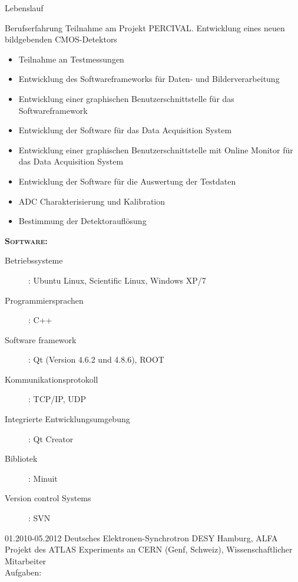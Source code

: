\documentclass[11pt,a4paper]{scrartcl}
\begin{document}
\begin{cv}{Lebenslauf}
\begin{cvlist}{Berufserfahrung}
Teilnahme am Projekt PERCIVAL. Entwicklung eines neuen
bildgebenden CMOS-Detektors
\begin{itemize}
  \item Teilnahme an Testmessungen
  \item Entwicklung des Softwareframeworks f{\"u}r Daten- und
  Bilderverarbeitung
  \item Entwicklung einer graphischen Benutzerschnittstelle f{\"u}r  das Softwareframework
  \item Entwicklung der Software f{\"u}r das Data Acquisition
  System
  \item Entwicklung einer graphischen Benutzerschnittstelle mit Online
  Monitor f{\"u}r das Data Acquisition System
  \item Entwicklung der Software f{\"u}r die Auswertung der Testdaten
  \item ADC Charakterisierung und Kalibration
  \item Bestimmung der Detektoraufl{\"o}sung
\end{itemize}

{\scshape {\bfseries Software:}}
\begin{description}
\item[Betriebssysteme] : Ubuntu Linux, Scientific Linux, Windows
XP/7
\item[Programmiersprachen] : C++
\item[Software framework] : Qt (Version 4.6.2 und 4.8.6), ROOT
 \item[Kommunikationsprotokoll] : TCP/IP, UDP
\item[Integrierte Entwicklungsumgebung] : Qt Creator
\item[Bibliotek] : Minuit
\item[Version control Systems] : SVN
\end{description}

\vspace{\baselineskip}

\item[01.2010-05.2012] Deutsches Elektronen-Synchrotron DESY
Hamburg, ALFA Projekt des ATLAS Experiments an CERN (Genf,
Schweiz), Wissenschaftlicher Mitarbeiter \\

Aufgaben:\\


\end{cvlist}
\end{cv}
\end{document}
